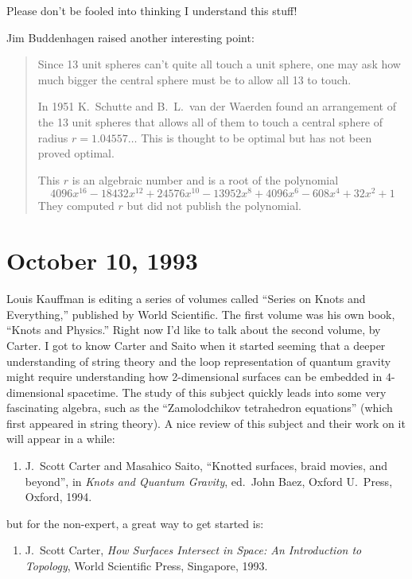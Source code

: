 \documentclass[12pt]{article}
\def\tightlist{}
\begin{document}
Please don't be fooled into thinking I understand this stuff!

Jim Buddenhagen raised another interesting point:

\begin{quote}
Since 13 unit spheres can't quite all touch a unit sphere, one may ask
how much bigger the central sphere must be to allow all 13 to touch.

In 1951 K.\ Schutte and B.\ L.\ van der Waerden found an arrangement of the
13 unit spheres that allows all of them to touch a central sphere of
radius \(r=1.04557\ldots\) This is thought to be optimal but has not
been proved optimal.

This \(r\) is an algebraic number and is a root of the polynomial
\[4096 x^{16} -18432 x^{12} +24576 x^{10} -13952 x^8 +4096 x^6 -608x^4 +32 x^2 +1\]
They computed \(r\) but did not publish the polynomial.
\end{quote}


\hypertarget{week21}{%
\section{October 10, 1993}\label{week21}}

Louis Kauffman is editing a series of volumes called ``Series on Knots
and Everything,'' published by World Scientific. The first volume was
his own book, ``Knots and Physics.'' Right now I'd like to talk about
the second volume, by Carter. I got to know Carter and Saito when it
started seeming that a deeper understanding of string theory and the
loop representation of quantum gravity might require understanding how
2-dimensional surfaces can be embedded in \(4\)-dimensional spacetime.
The study of this subject quickly leads into some very fascinating
algebra, such as the ``Zamolodchikov tetrahedron equations'' (which
first appeared in string theory). A nice review of this subject and
their work on it will appear in a while:

\begin{enumerate}
\def\labelenumi{\arabic{enumi})}
\tightlist
\item
 J.\ Scott Carter and Masahico Saito,  ``Knotted surfaces, braid movies, and beyond'', in \emph{Knots and Quantum Gravity}, ed.~John
  Baez, Oxford U.\ Press, Oxford, 1994.
\end{enumerate}
\noindent
but for the non-expert, a great way to get started is:

\begin{enumerate}
\def\labelenumi{\arabic{enumi})}
\setcounter{enumi}{1}
\tightlist
\item
  J.\ Scott Carter, \emph{How Surfaces Intersect in Space: An Introduction to Topology},
   World Scientific Press, Singapore, 1993.
\end{enumerate}
\end{document}
